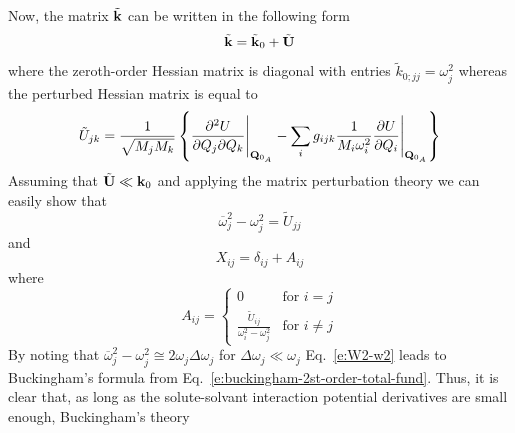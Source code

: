 \documentclass[a4paper,titlepage,twoside,fleqn,12pt]{book}
\newcommand{\fderiv}[2]{\ensuremath{
\frac{\partial #1}{\partial #2}}}
\newcommand{\sderivd}[3]{\ensuremath{
\frac{\partial^2 #1}{\partial #2 \partial #3}
}}
\begin{document}
\begin{refsection}
Now, 
the matrix $\tilde{\bf k}$ can be written
in the following form
%
\begin{equation} \label{e:jeden}
 \tilde{\bf k} = \tilde{\bf k}_0 + \tilde{\bf U}
\end{equation}
%
where the zeroth\hyp{}order Hessian matrix is diagonal
with entries $\tilde{k}_{0;jj}=\omega_j^2$ whereas
the perturbed Hessian matrix is equal to
%
\begin{equation}  \label{e:trzybulak}
 \tilde{U}_{jk} = \frac{1}{\sqrt{M_jM_k}} \left\{
            \sderivd{U}{Q_j}{Q_k}  \Bigg|_{{\bf Q}_{0_A}} 
           - \sum_i g_{ijk} \frac{1}{M_i\omega_i^2}\fderiv{U}{Q_i} \Bigg|_{{\bf Q}_{0_A}} 
           \right\}
\end{equation}
%
Assuming that $\tilde{\bf U}\ll {\bf k}_0$ and applying the
matrix perturbation theory we can easily show that
%
\begin{equation} \label{e:W2-w2}
 \overline{\omega}_j^2 - {\omega}_j^2 = 
 \tilde{U}_{jj}
\end{equation}
%
and
%
\begin{equation}
 X_{ij} = \delta_{ij} + A_{ij}
\end{equation}
%
where
%
\begin{equation}
 A_{ij} = 
\left\{\begin{matrix}
0 &\text{for $i=j$}\\ 
\frac{\tilde{U}_{ij}}{\omega_i^2-\omega_j^2} &\text{for $i\ne j$}
\end{matrix}\right.
\end{equation}
%
By noting that $\overline{\omega}_j^2 - {\omega}_j^2 \cong 2\omega_j\Delta\omega_j$
for $\Delta\omega_j\ll \omega_j$ Eq.~\eqref{e:W2-w2} leads
to Buckingham's formula from Eq.~\eqref{e:buckingham-2st-order-total-fund}.
Thus, it is clear that, as long as the solute\hyp{}solvant
interaction potential derivatives are small enough, Buckingham's theory

\end{refsection}
\end{document}
